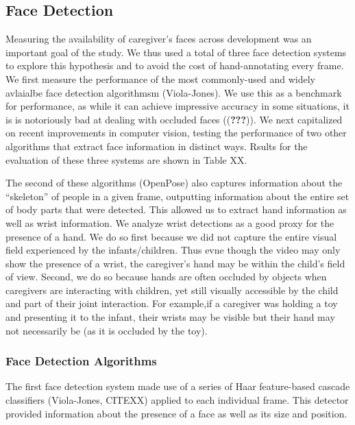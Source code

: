 \documentclass[10pt, letterpaper]{article}
\begin{document}
\subsection{Face Detection}\label{face-detection}

Measuring the availability of caregiver's faces across development was
an important goal of the study. We thus used a total of three face
detection systems to explore this hypothesis and to avoid the cost of
hand-annotating every frame. We first measure the performance of the
most commonly-used and widely avlaialbe face detection algorithmsm
(Viola-Jones). We use this as a benchmark for performance, as while it
can achieve impressive accuracy in some situations, it is is notoriously
bad at dealing with occluded faces (({\textbf{???}})). We next
capitalized on recent improvements in computer vision, testing the
performance of two other algorithms that extract face information in
distinct ways. Rsults for the evaluation of these three systems are
shown in Table XX.

The second of these algorithms (OpenPose) also captures information
about the ``skeleton'' of people in a given frame, outputting
information about the entire set of body parts that were detected. This
allowed us to extract hand information as well as wrist information. We
analyze wrist detections as a good proxy for the presence of a hand. We
do so first because we did not capture the entire visual field
experienced by the infants/children. Thus evne though the video may only
show the presence of a wrist, the caregiver's hand may be within the
child's field of view. Second, we do so because hands are often occluded
by objects when caregivers are interacting with children, yet still
visually accessible by the child and part of their joint interaction.
For example,if a caregiver was holding a toy and presenting it to the
infant, their wrists may be visible but their hand may not necessarily
be (as it is occluded by the toy).

\subsubsection{Face Detection
Algorithms}\label{face-detection-algorithms}

The first face detection system made use of a series of Haar
feature-based cascade classifiers (Viola-Jones, CITEXX) applied to each
individual frame. This detector provided information about the presence
of a face as well as its size and position.
\end{document}

